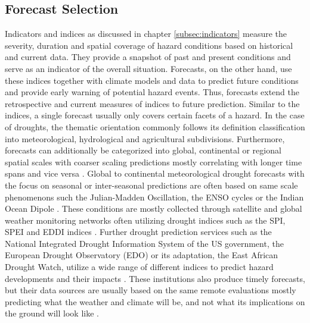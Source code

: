 \subsection{Forecast Selection}

Indicators and indices as discussed in chapter \ref{subsec:indicators} measure the severity, duration and spatial coverage of hazard conditions based on historical and current data. They provide a snapshot of past and present conditions and serve as an indicator of the overall situation. Forecasts, on the other hand, use these indices together with climate models and data to predict future conditions and provide early warning of potential hazard events. Thus, forecasts extend the retrospective and current measures of indices to future prediction.\newline
Similar to the indices, a single forecast usually only covers certain facets of a hazard. In the case of droughts, the thematic orientation commonly follows its definition classification into meteorological, hydrological and agricultural subdivisions. Furthermore, forecasts can additionally be categorized into global, continental or regional spatial scales with coarser scaling predictions mostly correlating with longer time spans and vice versa \autocite{baltiReviewDroughtMonitoring2020}. Global to continental meteorological drought forecasts with the focus on seasonal or inter-seasonal predictions are often based on same scale phenomenons such the Julian-Madden Oscillation, the ENSO cycles or the Indian Ocean Dipole \autocite{andersonMaddenJulianOscillationAffects2022,goreUnderstandingInfluenceENSO2020,yuanInfluencesIndianOcean2008}. These conditions are mostly collected through satellite and global weather monitoring networks often utilizing drought indices such as the SPI, SPEI and EDDI indices \autocite{kimIntegratedDroughtMonitoring2021}. Further drought prediction services such as the National Integrated Drought Information System of the US government, the European Drought Observatory (EDO) or its adaptation, the East African Drought Watch, utilize a wide range of different indices to predict hazard developments and their impacts \autocite{europeandroughtobservatoryDroughtIndicators2017,icpacDroughtIndicators2023, nidisOutlooksForecasts2023}. These institutions also produce timely forecasts, but their data sources are usually based on the same remote evaluations mostly predicting what the weather and climate will be, and not what its implications on the ground will look like \autocite{enenkelWhyPredictClimate2020}. 

